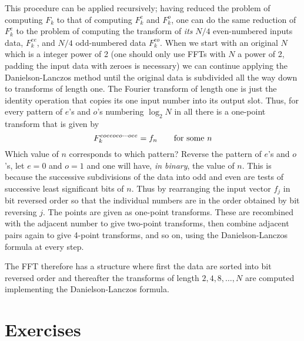This procedure can be applied recursively; having reduced the problem of
computing $F_k$ to that of computing $F_k^e$ and $F_k^o$, one can do the 
same reduction of $F_k^e$ to the problem of computing the transform of 
{\it its} $N/4$ even-numbered inputs data, $F_k^{ee}$, and $N/4$ odd-numbered 
data $F_k^{eo}$. When we start with an original $N$ which is a integer 
power of 2 (one should only use FFTs with $N$ a power of 2, padding the input
data with zeroes is necessary) we can continue applying the Danielson-Lanczos 
method until the original data is subdivided all the way down to transforms
of length one. The Fourier transform of length one is just the identity 
operation that copies its one input number into its output slot. Thus, 
for every pattern of $e$'s and $o$'s numbering $\log_2 N$ in all there is a 
one-point transform that is given by 
\[
F_k^{eoeeoeo\cdots oee}=f_n\qquad {\rm for~some~}n
\]
Which value of $n$ corresponds to which pattern? Reverse the pattern of 
$e$'s and $o$'s, let $e=0$ and $o=1$ and one will have, {\it in binary}, the
value of $n$. This is because the successive subdivisions of the data into 
odd and even are tests of successive least significant bits of $n$. Thus
by rearranging the input vector $f_j$ in bit reversed order so that the 
individual numbers are in the order obtained by bit reversing $j$. The points
are given as one-point transforms. These are recombined with the adjacent 
number to give two-point transforms, then combine adjacent pairs again to 
give 4-point transforms, and so on, using the Danielson-Lanczos formula
at every step.

The FFT therefore has a structure where first the data are sorted into
bit reversed order and thereafter the transforms of length $2,4,8,\ldots,N$
are computed implementing the Danielson-Lanczos formula.

\section{Exercises}

